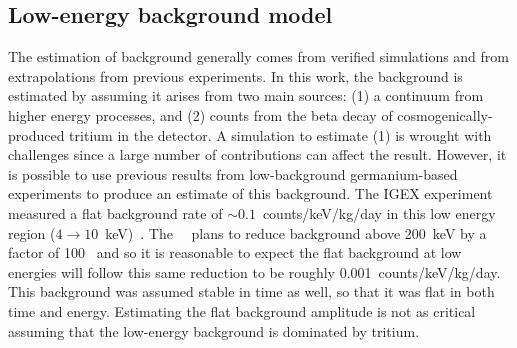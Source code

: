 		\subsection{Low-energy background model}
		\label{sec:MJLowEnergyBackgroundModel}
		
The estimation of background generally comes from verified simulations and from extrapolations from previous experiments.  In this work, the background is estimated by assuming it arises from two main sources: (1) a continuum from higher energy processes, and (2) counts from the beta decay of cosmogenically-produced tritium in the detector.  A simulation to estimate (1) is wrought with challenges since a large number of contributions can affect the result.  However, it is possible to use previous results from low-background germanium-based experiments to produce an estimate of this background.  The IGEX experiment measured a flat background rate of $\sim0.1$~counts/keV/kg/day in this low energy region ($4\to10$~keV)~\cite{Ira01}.    The \MJ~\minmod~plans to reduce background above 200~keV by a factor of 100~\cite{Gaitskell:2003zr} and so it is reasonable to expect the flat background at low energies will follow this same reduction to be roughly 0.001~counts/keV/kg/day.  This background was assumed stable in time as well, so that it was flat in both time and energy.  Estimating the flat background amplitude is not as critical assuming that the low-energy background is dominated by tritium.  

